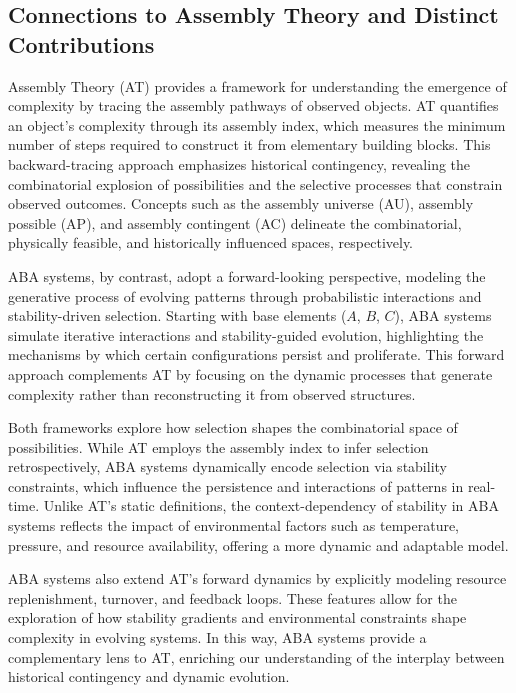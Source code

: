 \documentclass[entropy,article,submit,pdftex,oneauthor]{Definitions/mdpi}
\begin{document}
\subsection{Connections to Assembly Theory and Distinct Contributions}

Assembly Theory (AT) \cite{walker2023nature} provides a framework for understanding the emergence of complexity by tracing the assembly pathways of observed objects. AT quantifies an object’s complexity through its assembly index, which measures the minimum number of steps required to construct it from elementary building blocks. This backward-tracing approach emphasizes historical contingency, revealing the combinatorial explosion of possibilities and the selective processes that constrain observed outcomes. Concepts such as the assembly universe (AU), assembly possible (AP), and assembly contingent (AC) delineate the combinatorial, physically feasible, and historically influenced spaces, respectively.

ABA systems, by contrast, adopt a forward-looking perspective, modeling the generative process of evolving patterns through probabilistic interactions and stability-driven selection. Starting with base elements ($A$, $B$, $C$), ABA systems simulate iterative interactions and stability-guided evolution, highlighting the mechanisms by which certain configurations persist and proliferate. This forward approach complements AT by focusing on the dynamic processes that generate complexity rather than reconstructing it from observed structures.

Both frameworks explore how selection shapes the combinatorial space of possibilities. While AT employs the assembly index to infer selection retrospectively, ABA systems dynamically encode selection via stability constraints, which influence the persistence and interactions of patterns in real-time. Unlike AT’s static definitions, the context-dependency of stability in ABA systems reflects the impact of environmental factors such as temperature, pressure, and resource availability, offering a more dynamic and adaptable model.

ABA systems also extend AT’s forward dynamics by explicitly modeling resource replenishment, turnover, and feedback loops. These features allow for the exploration of how stability gradients and environmental constraints shape complexity in evolving systems. In this way, ABA systems provide a complementary lens to AT, enriching our understanding of the interplay between historical contingency and dynamic evolution.
\end{document}
